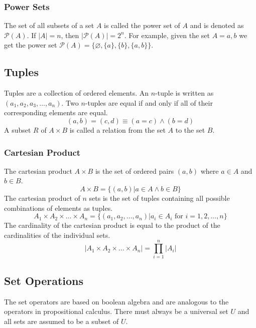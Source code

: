\documentclass[a4paper, 10pt]{article}
\begin{document}
\subsubsection{Power Sets}
The set of all subsets of a set \(A\) is called the power set of \(A\) and is denoted as \(\mathcal{P}(A)\). If \(|A| = n\), then \(|\mathcal{P}(A)| = 2^n\). For example, given the set \(A = {a, b}\) we get the power set \(\mathcal{P}(A) = \{\varnothing, \{a\}, \{b\}, \{a,b\}\}\).

\subsection{Tuples}
Tuples are a collection of ordered elements. An \(n\)-tuple is written as \((a_1, a_2, a_3,\ldots,a_n).\) Two \(n\)-tuples are equal if and only if all of their corresponding elements are equal.
\[(a,b) = (c,d)\equiv (a=c) \land (b=d)\]
A subset \(R\) of \(A\times B\) is called a relation from the set \(A\) to the set \(B\).

\subsubsection{Cartesian Product}
The cartesian product \(A\times B\) is the set of ordered pairs \((a,b)\) where \(a\in A\) and \(b\in B\).
\[A\times B = \{(a,b)|a\in A \land b\in B\}\]
The cartesian product of \(n\) sets is the set of tuples containing all possible combinations of elements as tuples.
\[ A_1\times A_2\times\ldots\times A_n = \{(a_1, a_2,\ldots, a_n)|a_i\in A_i \text{ for } i=1, 2,\ldots,n\} \]
The cardinality of the cartesian product is equal to the product of the cardinalities of the individual sets.
\[|A_1\times A_2\times\ldots\times A_n| = \prod_{i=1}^n|A_i| \]

\newpage
\subsection{Set Operations}
The set operators are based on boolean algebra and are analogous to the operators in propositional calculus. There must always be a universal set \(U\) and all sets are assumed to be a subset of \(U\).
\end{document}
